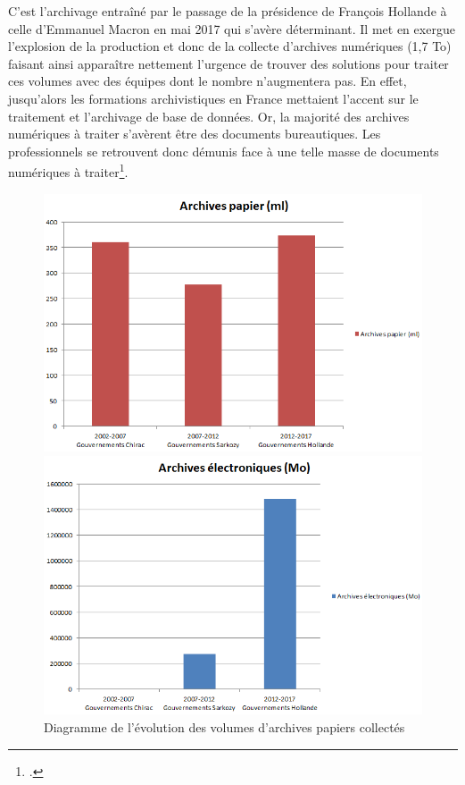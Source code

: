 C’est l’archivage entraîné par le passage de la présidence de François Hollande à celle d’Emmanuel Macron en mai 2017 qui s’avère déterminant. Il met en exergue l’explosion de la production et donc de la  collecte d’archives numériques (1,7 To) faisant ainsi apparaître nettement  l'urgence de trouver des solutions pour traiter ces volumes avec des équipes dont le nombre n’augmentera pas. En effet, jusqu’alors les formations archivistiques en France mettaient l’accent sur le traitement et l’archivage de base de données. Or, la majorité des archives numériques à traiter s’avèrent être des documents bureautiques. Les professionnels se retrouvent donc démunis face à une telle masse de documents numériques à traiter\footcite[p.20]{scopsi_quels_2024}.
\begin{figure}[h]
	\centering
	\begin{minipage}[b]{0.45\textwidth} %
		\centering
		\includegraphics[width=\textwidth]{illustrations/figure7.1.png}
		\caption{Diagramme de l’évolution des volumes d’archives papiers collectés}
		\label{figure7.1}
	\end{minipage}
	\hfill %
	\begin{minipage}[b]{0.45\textwidth}
		\centering
		\includegraphics[width=\textwidth]{illustrations/figure7.2.png} 

\end{minipage}
\end{figure}
